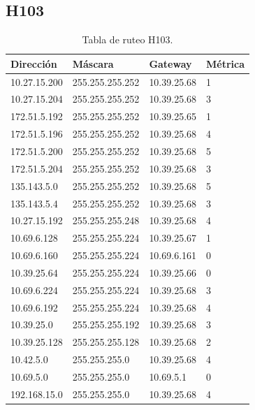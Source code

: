 \documentclass[12pt,titlepage]{article}
\begin{document}
\subsection{H103}
\begin{table}
  \begin{center}
    \begin{tabular}{|l|l|l|l|}
      \hline
        \bf{Direcci\'on} & \bf{M\'ascara} & \bf{Gateway} & \bf{M\'etrica} \\
      \hline 
	10.27.15.200  & 255.255.255.252 & 10.39.25.68 & 1 \\
        10.27.15.204  & 255.255.255.252 & 10.39.25.68 & 3 \\
        172.51.5.192  & 255.255.255.252 & 10.39.25.65 & 1 \\
        172.51.5.196  & 255.255.255.252 & 10.39.25.68 & 4 \\
        172.51.5.200  & 255.255.255.252 & 10.39.25.68 & 5 \\
        172.51.5.204  & 255.255.255.252 & 10.39.25.68 & 3 \\
        135.143.5.0   & 255.255.255.252 & 10.39.25.68 & 5 \\
        135.143.5.4   & 255.255.255.252 & 10.39.25.68 & 3 \\ 	
	10.27.15.192  & 255.255.255.248 & 10.39.25.68 & 4 \\
	10.69.6.128   & 255.255.255.224 & 10.39.25.67 & 1 \\
        10.69.6.160   & 255.255.255.224 & 10.69.6.161 & 0 \\
	10.39.25.64   & 255.255.255.224 & 10.39.25.66 & 0 \\       
	10.69.6.224   & 255.255.255.224 & 10.39.25.68 & 3 \\
	10.69.6.192   & 255.255.255.224 & 10.39.25.68 & 4 \\	
	10.39.25.0    & 255.255.255.192 & 10.39.25.68 & 3 \\
	10.39.25.128  & 255.255.255.128 & 10.39.25.68 & 2 \\
	10.42.5.0     & 255.255.255.0 & 10.39.25.68 & 4 \\
        10.69.5.0     & 255.255.255.0 & 10.69.5.1 & 0 \\
        192.168.15.0  & 255.255.255.0 & 10.39.25.68 & 4 \\  
    \hline
    \end{tabular} \\
  \end{center}
  \caption{Tabla de ruteo H103.}
\end{table}
\FloatBarrier
\end{document}
